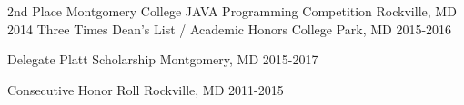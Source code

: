 

\begin{cvhonors}

\cvhonor
    {2nd Place}
    {Montgomery College JAVA Programming Competition}
    {Rockville, MD}
    {2014}
\cvhonor
    {Three Times}
    {Dean's List / Academic Honors}
    {College Park, MD}
    {2015-2016}

  \cvhonorSimple
    {}
    {Delegate Platt Scholarship}
    {Montgomery, MD}
    {2015-2017}

  \cvhonor
    {Consecutive}
    {Honor Roll}
    {Rockville, MD}
    {2011-2015}
\end{cvhonors}
